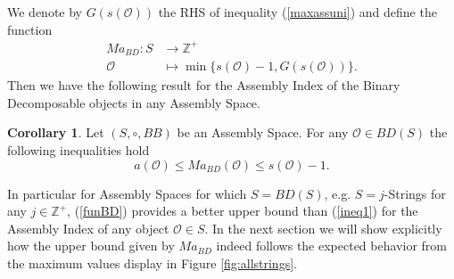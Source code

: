 \documentclass[letterpaper,12pt]{article}
\theoremstyle{definition}
\newtheorem{corollary}{Corollary}
\newtheorem{lemma}[theorem]{Lemma}
\begin{document}
We denote by $G(s(\mathscr{O}))$ the RHS of inequality (\ref{maxassuni}) and define the function 
\begin{equation}\label{funBD}
\begin{split}
    Ma_{BD}:S & \to \mathbb{Z}^+ \\
    \mathscr{O} & \mapsto \min \{s(\mathscr{O})-1,G(s(\mathscr{O}))\}.
\end{split}    
\end{equation}
Then we have the following result for the Assembly Index of the Binary Decomposable objects in any Assembly Space.
\begin{corollary}
       Let $(S,\circ,BB)$ be an Assembly Space. For any $\mathscr{O} \in BD(S)$ the following inequalities hold
    \begin{equation}\label{UBBD}
    a(\mathscr{O}) \leq Ma_{BD}(\mathscr{O}) \leq s(\mathscr{O})-1.
    \end{equation}
\end{corollary}

In particular for Assembly Spaces for which $S=BD(S)$, e.g. $S=j$-Strings for any $j \in \mathbb{Z}^+$, (\ref{funBD}) provides a better upper bound than (\ref{ineq1}) for the Assembly Index of any object $\mathscr{O} \in S$. In the next section we will show explicitly how the upper bound given by $Ma_{BD}$ indeed follows the expected behavior from the maximum values display in Figure \ref{fig:allstrings}.    





    

\end{document}
